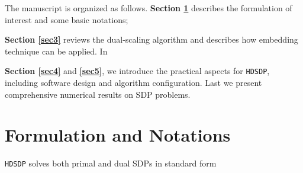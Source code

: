 The manuscript is organized as follows. \textbf{Section \ref{sec2}} 
describes the formulation of interest and some basic notations;
{\textbf{Section \ref{sec3}} reviews the dual-scaling algorithm
and describes how embedding technique can be applied. 
In {\textbf{Section \ref{sec4}} and \textbf{\ref{sec5}}, we introduce the practical aspects for {{\texttt{HDSDP}}}, including software design and algorithm configuration.  Last we present comprehensive numerical results on SDP problems.

\section{Formulation and Notations} \label{sec2}

{{\texttt{HDSDP}}} solves both primal and dual SDPs in standard form

{}\\

}}
